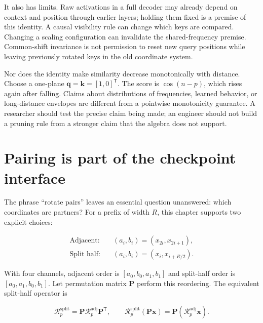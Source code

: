 It also has limits. Raw activations in a full decoder may already depend
on context and position through earlier layers; holding them fixed is a
premise of this identity. A causal visibility rule can change which keys
are compared. Changing a scaling configuration can invalidate the
shared-frequency premise. Common-shift invariance is not permission to
reset new query positions while leaving previously rotated keys in the
old coordinate system.

Nor does the identity make similarity decrease monotonically with
distance. Choose a one-plane
\(\mathbf{q}=\mathbf{k}=[1,0]^{\mathsf T}\). The score is \(\cos(n-p)\),
which rises again after falling. Claims about distributions of
frequencies, learned behavior, or long-distance envelopes are different
from a pointwise monotonicity guarantee. A researcher should test the
precise claim being made; an engineer should not build a pruning rule
from a stronger claim that the algebra does not support.

\section{Pairing is part of the checkpoint
interface}\label{pairing-is-part-of-the-checkpoint-interface}


The phrase ``rotate pairs'' leaves an essential question unanswered:
which coordinates are partners? For a prefix of width \(R\), this
chapter supports two explicit choices:

\begin{equation}
\begin{aligned}
\text{Adjacent:}\quad &(a_i,b_i)=(x_{2i},x_{2i+1}),\\
\text{Split half:}\quad &(a_i,b_i)=(x_i,x_{i+R/2}).
\end{aligned}
\end{equation}

With four channels, adjacent order is \([a_0,b_0,a_1,b_1]\) and
split-half order is \([a_0,a_1,b_0,b_1]\). Let permutation matrix
\(\mathbf{P}\) perform this reordering. The equivalent split-half
operator is

\begin{equation}
\mathcal{R}^{\mathrm{split}}_p
=\mathbf{P}\mathcal{R}^{\mathrm{adj}}_p\mathbf{P}^{\mathsf T},\qquad
\mathcal{R}^{\mathrm{split}}_p(\mathbf{P}\mathbf{x})
=\mathbf{P}(\mathcal{R}^{\mathrm{adj}}_p\mathbf{x}).
\end{equation}

